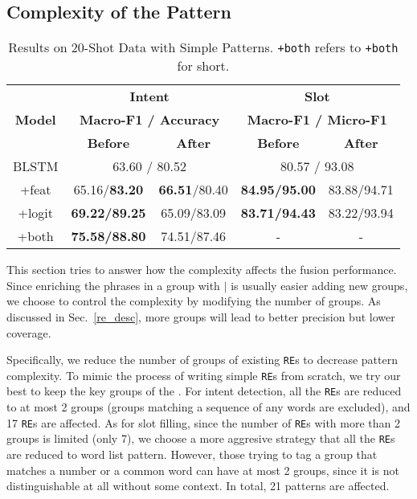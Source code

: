 \subsection{Complexity of the Pattern}
\label{sec_complexity}
\begin{table}
\setlength{\tabcolsep}{0.23em}
\centering
\small{
\begin{tabular}{|c|c|c|c|c|}

\hline
\multirow{3}{*}{\textbf{Model}}  & \multicolumn{2}{|c|}{\textbf{Intent}} & \multicolumn{2}{|c|}{\textbf{Slot}}  \\
\cline{2-5}
  & \multicolumn{2}{|c|}{\textbf{Macro-F1 / Accuracy}} & \multicolumn{2}{|c|}{\textbf{Macro-F1 / Micro-F1}}  \\
\cline{2-5}
  & \textbf{Before} & \textbf{After} & \textbf{Before} & \textbf{After} \\
\hline
BLSTM & \multicolumn{2}{|c|}{63.60 / 80.52} & \multicolumn{2}{|c|}{80.57 / 93.08}  \\
\hline
+feat & 65.16/\textbf{83.20} & \textbf{66.51}/80.40 & \textbf{84.95/95.00} & 83.88/94.71 \\
\hline
+logit & \textbf{69.22/89.25} & 65.09/83.09 & \textbf{83.71/94.43} & 83.22/93.94  \\
\hline
+both & \textbf{75.58/88.80} & 74.51/87.46 & - & - \\
\hline 
\end{tabular}
}
\caption{Results on 20-Shot Data with Simple Patterns. \texttt{+both} refers to \ptatt\texttt{+both} for short.}
\label{tab_simple}
\end{table}

This section tries to answer how the \RE complexity affects the fusion performance.
Since enriching the phrases in a group with $|$ is usually easier adding new groups,
we choose to control the \RE complexity by modifying the number of groups.
As discussed in Sec.~\ref{re_desc}, more groups will lead to better precision but lower coverage.

Specifically, we reduce the number of groups of existing \texttt{RE}s to decrease pattern complexity.
To mimic the process of writing simple \texttt{RE}s from scratch, we try our best to keep the key groups of the \RE.
For intent detection, all the \texttt{RE}s are reduced to at most 2 groups (groups matching a sequence of any words are excluded), and 17 \texttt{RE}s are affected. 
As for slot filling, since the number of \texttt{RE}s with more than 2 groups is limited (only 7), we choose a more aggresive strategy that all the \texttt{RE}s are reduced to word list pattern.
However, those trying to tag a group that matches a number or a common word can have at most 2 groups, since it is not distinguishable at all without some context.
In total, 21 patterns are affected.

